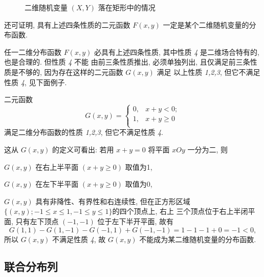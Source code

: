    \begin{figure}[htbp]
   	\centering
   	\caption{二维随机变量 $(X,Y)$ 落在矩形中的情况}\label{fig:3.1.2}
   \end{figure}
   还可证明, 具有上述四条性质的二元函数 $F(x,y)$ 一定是某个二维随机变量的分布函数.

   任一二维分布函数 $F(x,y)$ 必具有上述四条性质, 其中性质 \textit{4} 是二维场合特有的, 也是合理的. 但性质 \textit{4} 不能
   由前三条性质推出, 必须单独列出, 且仅满足前三条性质是不够的, 因为存在这样的二元函数 $G(x,y)$ 满足
   以上性质 \textit{1,2,3}, 但它不满足性质 \textit{4}, 见下面例子.

   \begin{example}\label{exam:3.1.1}
   	二元函数
   	\[
   	 	G(x,y)=\begin{cases}
   	 		0,	& x+y<0;\\
   	 		1,	& x+y\geq 0 \\
   	 	\end{cases}
   	\]
   	满足二维分布函数的性质 \textit{1,2,3}, 但它不满足性质 \textit{4}.

    这从 $G(x,y)$ 的定义可看出: 若用 $x+y=0$ 将平面 $xOy$ 一分为二, 则

    $G(x,y)$ 在右上半平面 $(x+y\geq 0)$ 取值为1,

    $G(x,y)$ 在左下半平面 $(x+y\geq 0)$ 取值为0,

    $G(x,y)$ 具有非降性、有界性和右连续性, 但在正方形区域 $\{(x,y); -1\leq x\leq 1,-1\leq y\leq 1\}$的四个顶点上, 右上
    三个顶点位于右上半闭平面, 只有左下顶点 $(-1,-1)$ 位于左下半开平面, 故有
    \[
     	G(1,1)-G(1,-1)-G(-1,1)+G(-1,-1)=1-1-1+0=-1<0,
    \]
	所以 $G(x,y)$ 不满足性质 \textit{4}, 故 $G(x,y)$ 不能成为某二维随机变量的分布函数.
   \end{example}

   \subsection{联合分布列}\label{ssec:3.1.3}

